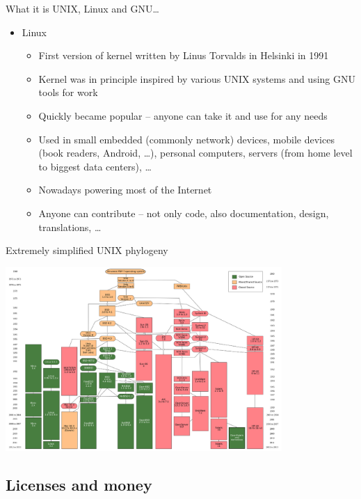 \documentclass[compress, ucs, xelatex, 11pt, xcolor=svgnames,
  hyperref={
    bookmarks=true,
    unicode=true,
    colorlinks=true,
    pdftitle={Linux, command line and MetaCentrum},
    plainpages=false,
    pdfauthor={Vojtech Zeisek},
    pdfsubject={Course about use of Linux command line, writing shell scripts and using MetaCentrum of CESNET},
    pdfcreator={XeLaTeX},
    pdfkeywords={Linux, GNU, BASH, shell, command line, MetaCentrum},
    linkcolor=Red,
    anchorcolor=Blue,
    citecolor=Purple,
    filecolor=DodgerBlue,
    menucolor=DarkOrchid,
    urlcolor=DeepSkyBlue,
    pdftex},
  url={hyphens, lowtilde} %
  ]{beamer}
\begin{document}
\begin{frame}[allowframebreaks]{What it is UNIX, Linux and GNU\ldots}
\begin{itemize}
\begin{itemize}
    \item Source code is free -- anyone can study it (Security!), report bugs, contribute, modify, share it, \ldots
    \item GNU General Public License (GPL) -- free spirit of open-source -- license, idea, how to share software
  \end{itemize}
  \item Linux
  \begin{itemize}
    \item First version of kernel written by Linus Torvalds in Helsinki in 1991
    \item Kernel was in principle inspired by various UNIX systems and using GNU tools for work
    \item Quickly became popular -- anyone can take it and use for any needs
    \item Used in small embedded (commonly network) devices, mobile devices (book readers, Android, \ldots), personal computers, servers (from home level to biggest data centers), \ldots
    \item Nowadays powering most of the Internet
    \item Anyone can contribute -- not only code, also documentation, design, translations, \ldots
  \end{itemize}
\end{itemize}
\end{frame}

\begin{frame}{Extremely simplified UNIX phylogeny}
\begin{center}
  \includegraphics[height=7cm]{unix_history-simple.png}
\end{center}
\end{frame}

\subsection{Licenses and money}
\end{document}
